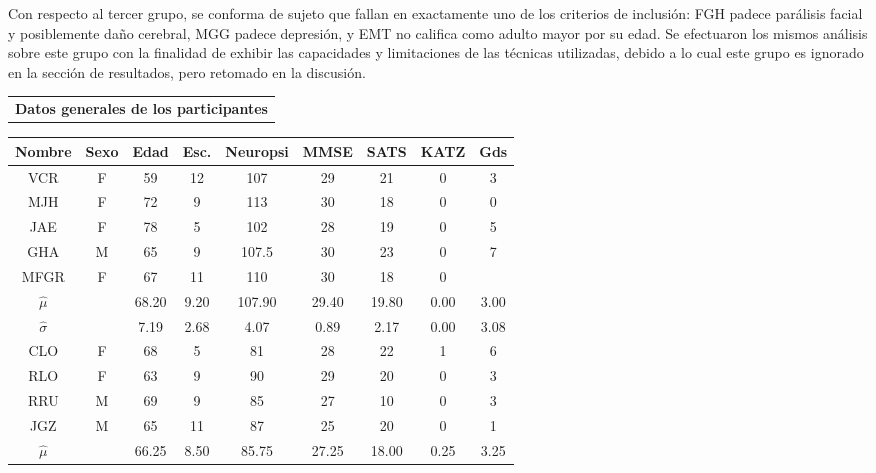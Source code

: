 \documentclass[12pt,a4paper]{mitthesis}
\begin{document}
Con respecto al tercer grupo, se conforma de sujeto que
fallan en exactamente uno de los criterios de 
inclusi\'on: FGH padece par\'alisis facial y posiblemente da\~no cerebral, MGG padece depresi\'on, 
y EMT no califica como adulto mayor por su edad.
Se efectuaron los mismos an\'alisis sobre este grupo con la finalidad de exhibir las capacidades y
limitaciones de las t\'ecnicas utilizadas, debido a lo cual este grupo es ignorado en la secci\'on 
de resultados, pero retomado en la discusi\'on.

\begin{table}
\centering
\begin{tabular}{c}
\textbf{Datos generales de los participantes}
\vspace{1em}
\end{tabular}
\begin{small}
\begin{tabular}{c|ccc|ccccc}
\textbf{Nombre} & \textbf{Sexo} & \textbf{Edad} & \textbf{Esc.} & \textbf{Neuropsi} & \textbf{MMSE} & \textbf{SATS} & \textbf{KATZ} & \textbf{Gds} \\
\hline 
\hline 
VCR    & F    & 59   & 12   & 107      & 29   & 21   & 0    & 3 \\
MJH    & F    & 72   & 9    & 113      & 30   & 18   & 0    & 0 \\
JAE    & F    & 78   & 5    & 102      & 28   & 19   & 0    & 5 \\
GHA    & M    & 65   & 9    & 107.5    & 30   & 23   & 0    & 7 \\
MFGR   & F    & 67   & 11   & 110      & 30   & 18   & 0    &   \\
\hline 
$\widehat{\mu}$ & 
              & 68.20& 9.20 & 107.90   & 29.40& 19.80& 0.00 & 3.00\\
$\widehat{\sigma}$ & 
              & 7.19 & 2.68 & 4.07     & 0.89 & 2.17 & 0.00 & 3.08\\
\hline 
\hline 
CLO    & F    & 68   & 5    & 81       & 28   & 22   & 1    & 6 \\
RLO    & F    & 63   & 9    & 90       & 29   & 20   & 0    & 3 \\
RRU    & M    & 69   & 9    & 85       & 27   & 10   & 0    & 3 \\
JGZ    & M    & 65   & 11   & 87       & 25   & 20   & 0    & 1 \\
\hline 
$\widehat{\mu}$ & 
              & 66.25& 8.50 & 85.75   & 27.25& 18.00& 0.25 & 3.25\\

\end{tabular}
\end{small}
\end{table}
\end{document}
